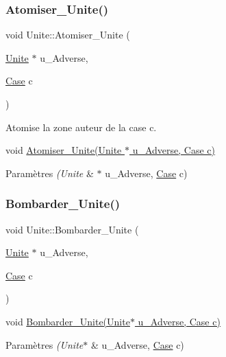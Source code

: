 \subsubsection{\texorpdfstring{Atomiser\+\_\+\+Unite()}{Atomiser\_Unite()}}
{\footnotesize\ttfamily void Unite\+::\+Atomiser\+\_\+\+Unite (\begin{DoxyParamCaption}\item[{\hyperlink{classUnite}{Unite} $\ast$}]{u\+\_\+\+Adverse,  }\item[{\hyperlink{classCase}{Case}}]{c }\end{DoxyParamCaption})}



Atomise la zone auteur de la case c. 

void \hyperlink{classUnite_ab4a981ed28ae5c8fcdbbf265fa01634a}{Atomiser\+\_\+\+Unite(\+Unite $\ast$ u\+\_\+\+Adverse, Case c)} 
\begin{DoxyParams}{Paramètres}
{\em (\+Unite} & $\ast$ u\+\_\+\+Adverse, \hyperlink{classCase}{Case} c) \\
\hline
\end{DoxyParams}
\mbox{\label{classUnite_ab7deefcee36cfaf50860b5292b6d4d30}} 
\subsubsection{\texorpdfstring{Bombarder\+\_\+\+Unite()}{Bombarder\_Unite()}}
{\footnotesize\ttfamily void Unite\+::\+Bombarder\+\_\+\+Unite (\begin{DoxyParamCaption}\item[{\hyperlink{classUnite}{Unite} $\ast$}]{u\+\_\+\+Adverse,  }\item[{\hyperlink{classCase}{Case}}]{c }\end{DoxyParamCaption})}



void \hyperlink{classUnite_ab7deefcee36cfaf50860b5292b6d4d30}{Bombarder\+\_\+\+Unite(\+Unite$\ast$ u\+\_\+\+Adverse, Case c)} 


\begin{DoxyParams}{Paramètres}
{\em (\+Unite$\ast$} & u\+\_\+\+Adverse, \hyperlink{classCase}{Case} c) \\
\hline
\end{DoxyParams}
\mbox{\label{classUnite_aebf5256ee817c332f1ff9d1874b4b35b}} 
